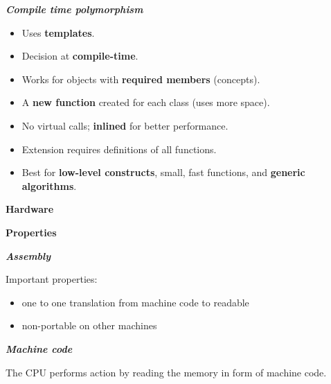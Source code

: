 \documentclass[fontsize=8pt, a4paper, landscape, fleqn]{scrartcl}
\renewcommand{\section}[1]{%
    \noindent\colorbox{sectioncolor}{%
        \parbox{\dimexpr\columnwidth-2\fboxsep}{\color{white}\textbf{#1}}}%
    \vspace{0.5mm}%
}
\renewcommand{\subsection}[1]{%
    \noindent\colorbox{subsectioncolor}{%
        \parbox{\dimexpr\columnwidth-2\fboxsep}{\color{white}\textbf{#1}}}%
    \vspace{0.5mm}%
}
\renewcommand{\subsubsection}[1]{%
    \noindent\textbf{\textit{\color{subsectioncolor}#1}}%
    \vspace{1mm}%
}
\begin{document}
\begin{multicols*}{3}[\raggedcolumns]
\subsubsection{Compile time polymorphism}
\begin{itemize}
    \item Uses \textbf{templates}.
    \item Decision at \textbf{compile-time}.
    \item Works for objects with \textbf{required members} (concepts).
    \item A \textbf{new function} created for each class (uses more space).
    \item No virtual calls; \textbf{inlined} for better performance.
    \item Extension requires definitions of all functions.
    \item Best for \textbf{low-level constructs}, small, fast functions, and \textbf{generic algorithms}.
\end{itemize}

    \section{Hardware}
    \subsection{Properties}
    
    \subsubsection{Assembly}
    Important properties:
    \begin{itemize}
        \item one to one translation from machine code to readable
        \item non-portable on other machines
    \end{itemize}
    
    \subsubsection{Machine code}
    The CPU performs action by reading the memory in form of machine code.
    

\end{multicols*}
\end{document}
